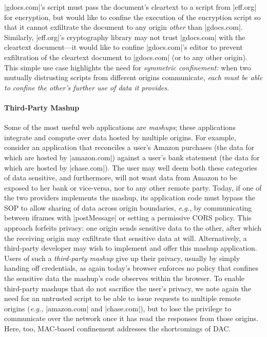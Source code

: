 \js|gdocs.com|'s script must pass the document's cleartext to a script
from \js|eff.org| for encryption, but would like to confine the
execution of the encryption script so that it cannot exfiltrate the
document to any origin {\em other} than \js|gdocs.com|. Similarly,
\js|eff.org|'s cryptography library may not trust \js|gdocs.com| with
the cleartext document---it would like to confine \js|gdocs.com|'s
editor to prevent exfiltration of the cleartext document to
\js|gdocs.com| (or to any other origin).
%
This simple use case highlights the need for {\em
  symmetric confinement:} when two mutually distrusting scripts from
different origins communicate, {\em each must be able to confine the
  other's further use of data it provides.}
%


\paragraph{Third-Party Mashup}
Some of the most useful web applications are {\em mashups}; these
applications integrate and compute over data hosted by multiple
origins. For example, consider an application that reconciles a user's
Amazon purchases (the data for which are hosted by \js|amazon.com|)
against a user's bank statement (the data for which are hosted by
\js|chase.com|). The user may well deem both these categories of data
sensitive, and furthermore, will not want data from Amazon to be
exposed to her bank or vice-versa, nor to any other remote party.
Today, if one of the two providers implements the mashup, its
application code must bypass the SOP to allow sharing of data across
origin boundaries, \emph{e.g.,} by communicating between iframes with
\js|postMessage| or setting a permissive CORS policy.  This approach
forfeits privacy: one origin sends sensitive data to the other, after
which the receiving origin may exfiltrate that sensitive data at will.
Alternatively, a third-party developer may wish to implement and offer
this mashup application. Users of such a {\em third-party mashup} give
up their privacy, usually by simply handing off credentials, as again
today's browser enforces no policy that confines the sensitive data
the mashup's code observes within the browser. To enable third-party
mashups that do not sacrifice the user's privacy, we note again the
need for an untrusted script to be able to issue requests to multiple
remote origins (\emph{e.g.,} \js|amazon.com| and \js|chase.com|), but
to lose the privilege to communicate over the network once it has read
the responses from those origins. Here, too, MAC-based confinement
addresses the shortcomings of DAC. 

